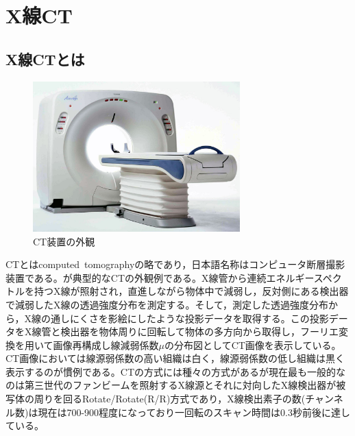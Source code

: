 \chapter{X線CT}



\section{X線CTとは}
\begin{figure}
 \begin{center}
 \includegraphics[width=8cm]{image/other/CT_toshiba.eps}
 \end{center}
 \caption{CT装置の外観\cite{toshiba_CT}}
 \label{fig:CT_toshiba}
\end{figure}
CTとはcomputed\ tomographyの略であり，日本語名称はコンピュータ断層撮影装置である。が典型的なCTの外観例である。X線管から連続エネルギースペクトルを持つX線が照射され，直進しながら物体中で減弱し，反対側にある検出器で減弱したX線の透過強度分布を測定する。そして，測定した透過強度分布から，X線の通しにくさを影絵にしたような投影データを取得する。この投影データをX線管と検出器を物体周りに回転して物体の多方向から取得し，フーリエ変換を用いて画像再構成し線減弱係数$\mu$の分布図としてCT画像を表示している。CT画像においては線源弱係数の高い組織は白く，線源弱係数の低し組織は黒く表示するのが慣例である。CTの方式には種々の方式があるが現在最も一般的なのは第三世代のファンビームを照射するX線源とそれに対向したX線検出器が被写体の周りを回るRotate/Rotate(R/R)方式であり，X線検出素子の数(チャンネル数)は現在は700-900程度になっており一回転のスキャン時間は0.3秒前後に達している。\\


